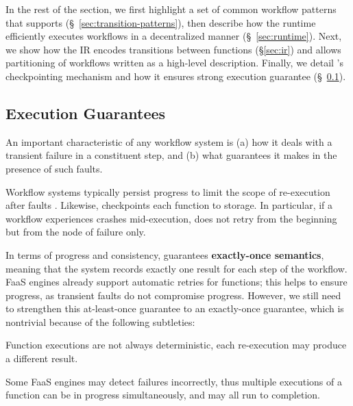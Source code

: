 In the rest of the section, we first highlight a set of common workflow
patterns that \name{} supports (\S~\ref{sec:transition-patterns}), then
describe how the \name{} runtime efficiently executes workflows in a
decentralized manner (\S~\ref{sec:runtime}). Next, we show how the \name{} IR
encodes transitions between functions (\S\ref{sec:ir}) and allows partitioning
of workflows written as a high-level description. Finally, we detail \name{}'s
checkpointing mechanism and how it ensures strong execution guarantee
(\S~\ref{sec:exec-gntee}).










\subsection{Execution Guarantees}\label{sec:exec-gntee}

An important characteristic of any workflow system is (a) how it deals with  a
transient failure in a constituent step, and (b) what guarantees it makes in
the presence of such faults.
 
Workflow systems typically persist progress to limit the scope of re-execution after faults
\cite{aws-step-functions, durable-functions, netherite, google-workflows, kappa}.
Likewise, \name{} checkpoints each function to storage.
 In particular, if a workflow experiences crashes mid-execution,
\name{} does not retry from the beginning but from the node of failure only.

In terms of progress and consistency, \name{} guarantees \textbf{exactly-once semantics}, 
meaning that the system records
exactly one result for each step of the workflow. FaaS engines already
support automatic retries for functions; this helps to ensure progress, as transient
faults do not compromise progress. However, we still need to
strengthen this at-least-once guarantee to an exactly-once guarantee, which 
is nontrivial because of the following subtleties:

\squishlist
	\item Function executions are not always deterministic, each re-execution
	may produce a different result.
	\item Some FaaS engines may detect failures incorrectly, thus multiple
	executions of a function can be in progress simultaneously, and may all run to completion.
\squishend
\vspace{1ex}

